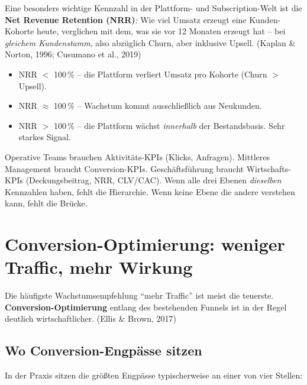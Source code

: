 \documentclass[11pt,a4paper,oneside]{article}
\newcommand{\fachbegriff}[1]{\textbf{#1}}
\newcommand{\quelle}[1]{{\footnotesize\color{lpGray}(#1)}}
\begin{document}
Eine besonders wichtige Kennzahl in der Plattform- und Subscription-Welt ist die \fachbegriff{Net Revenue Retention (NRR)}: Wie viel Umsatz erzeugt eine Kunden-Kohorte heute, verglichen mit dem, was sie vor 12 Monaten erzeugt hat -- bei \emph{gleichem Kundenstamm}, also abzüglich Churn, aber inklusive Upsell. \quelle{Kaplan \& Norton, 1996; Cusumano et al., 2019}

\begin{itemize}
  \item NRR $<$ 100\,\% -- die Plattform verliert Umsatz pro Kohorte (Churn $>$ Upsell).
  \item NRR $\approx$ 100\,\% -- Wachstum kommt ausschließlich aus Neukunden.
  \item NRR $>$ 100\,\% -- die Plattform wächst \emph{innerhalb} der Bestandsbasis. Sehr starkes Signal.
\end{itemize}

\begin{merkbox}
Operative Teams brauchen Aktivitäts-KPIs (Klicks, Anfragen). Mittleres Management braucht Conversion-KPIs. Geschäftsführung braucht Wirtschafts-KPIs (Deckungsbeitrag, NRR, CLV/CAC). Wenn alle drei Ebenen \emph{dieselben} Kennzahlen haben, fehlt die Hierarchie. Wenn keine Ebene die andere verstehen kann, fehlt die Brücke.
\end{merkbox}

\section{Conversion-Optimierung: weniger Traffic, mehr Wirkung}

Die häufigste Wachstumsempfehlung ``mehr Traffic'' ist meist die teuerste. \fachbegriff{Conversion-Optimierung} entlang des bestehenden Funnels ist in der Regel deutlich wirtschaftlicher. \quelle{Ellis \& Brown, 2017}

\subsection{Wo Conversion-Engpässe sitzen}

In der Praxis sitzen die größten Engpässe typischerweise an einer von vier Stellen:
\end{document}
